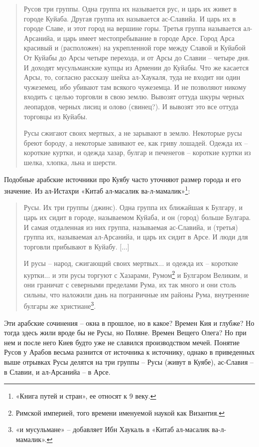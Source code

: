 \begin{quotation}
Русов три группы. Одна группа их называется рус, и царь их живет в городе Куйаба. Другая группа их называется ас-Славийа. И царь их в городе Славе, и этот город на вершине горы. Третья группа называется ал-Арсанийа, и царь имеет местопребывание в городе Арсе. Город Арса красивый и (расположен) на укрепленной горе между Славой и Куйабой От Куйабы до Арсы четыре перехода, и от Арсы до Славии – четыре дня. И доходят мусульманские купцы из Армении до Куйабы. Что же касается Арсы, то, согласно рассказу шейха ал-Хаукаля, туда не входит ни один чужеземец, ибо убивают там всякого чужеземца. И не позволяют никому входить с целью торговли в свою землю. Вывозят оттуда шкуры черных леопардов, черных лисиц и олово (свинец?). И вывозят это все оттуда торговцы из Куйабы. 

Русы сжигают своих мертвых, а не зарывают в землю. Некоторые русы бреют бороду, а некоторые завивают ее, как гриву лошадей. Одежда их – короткие куртки, и одежда хазар, булгар и печенегов – короткие куртки из шелка, хлопка, льна и шерсти.
\end{quotation}

Подобные арабские источники про Куябу часто уточняют размер города и его значение. Из ал-Истахри «Китаб ал-масалик ва-л-мамалик»\footnote{«Книга путей и стран», ее относят к 9 веку.}:

\begin{quotation}
Русы. Их три группы (джинс). Одна группа их ближайшая к Булгару, и царь их сидит в городе, называемом Куйаба, и он (город) больше Булгара. И самая отдаленная из них группа, называемая ас-Славийа, и (третья) группа их, называемая ал-Арсанийа, и царь их сидит в Арсе. И люди для торговли прибывают в Куйабу. [...]

И русы – народ, сжигающий своих мертвых... и одежда их – короткие куртки... и эти русы торгуют с Хазарами, Румом\footnote{Римской империей, того времени именуемой наукой как Византия.} и Булгаром Великим, и они граничат с северными пределами Рума, их так много и они столь сильны, что наложили дань на пограничные им районы Рума, внутренние булгары же христиане\footnote{«и мусульмане» – добавляет Ибн Хаукаль в «Китаб ал-масалик ва-л-мамалик».}.
\end{quotation}

Эти арабские сочинения – окна в прошлое, но в какое? Времен Кия и глубже? Но тогда здесь жили вроде бы не Русы, но Поляне. Времен Вещего Олега? Но при нем и после него Киев будто уже не славился производством мечей. Понятие Русов у Арабов весьма разнится от источника к источнику, однако в приведенных выше отрывках Русы делятся на три группы – Русы (живут в Куябе), ас-Славия – в Славии, и ал-Арсанийа – в Арсе.

